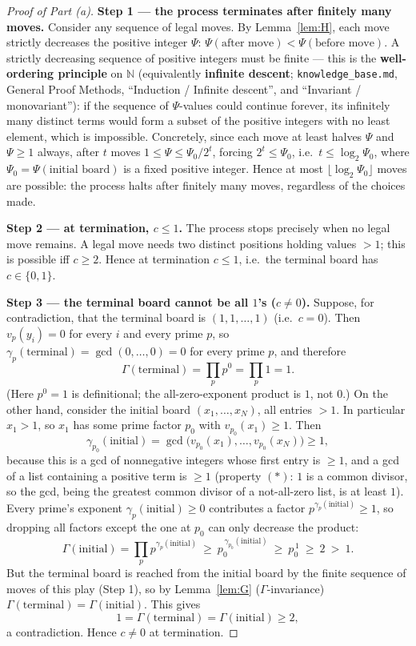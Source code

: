 \documentclass[11pt]{article}
\theoremstyle{plain}
\theoremstyle{definition}
\theoremstyle{remark}
\begin{document}
\begin{proof}[Proof of Part (a)]
\textbf{Step 1 --- the process terminates after finitely many moves.}
Consider any sequence of legal moves. By Lemma~\ref{lem:H}, each move
strictly decreases the positive integer $\Psi$:
$\Psi(\text{after move})<\Psi(\text{before move})$. A strictly decreasing
sequence of positive integers must be finite --- this is the \textbf{well-ordering
principle} on $\mathbb{N}$ (equivalently \textbf{infinite descent};
\texttt{knowledge\_base.md}, General Proof Methods, ``Induction / Infinite
descent'', and ``Invariant / monovariant''): if the sequence of $\Psi$-values
could continue forever, its infinitely many distinct terms would form a
subset of the positive integers with no least element, which is impossible.
Concretely, since each move at least halves $\Psi$ and $\Psi\ge 1$ always,
after $t$ moves $1\le\Psi\le \Psi_0/2^{t}$, forcing $2^{t}\le\Psi_0$, i.e.\
$t\le\log_2\Psi_0$, where $\Psi_0=\Psi(\text{initial board})$ is a fixed
positive integer. Hence at most $\lfloor\log_2\Psi_0\rfloor$ moves are
possible: the process halts after finitely many moves, regardless of the
choices made.

\medskip
\textbf{Step 2 --- at termination, $c\le 1$.} The process stops precisely
when no legal move remains. A legal move needs two distinct positions holding
values $>1$; this is possible iff $c\ge 2$. Hence at termination $c\le 1$,
i.e.\ the terminal board has $c\in\{0,1\}$.

\medskip
\textbf{Step 3 --- the terminal board cannot be all $1$'s ($c\ne 0$).}
Suppose, for contradiction, that the terminal board is $(1,1,\dots,1)$ (i.e.\
$c=0$). Then $v_p(y_i)=0$ for every $i$ and every prime $p$, so
$\gamma_p(\text{terminal})= \gcd(0,\dots,0)=0$ for every prime $p$, and
therefore
\[
\Gamma(\text{terminal})=\prod_p p^{0}=\prod_p 1=1.
\]
(Here $p^0=1$ is definitional; the all-zero-exponent product is $1$, not $0$.)
On the other hand, consider the initial board $(x_1,\dots,x_N)$, all entries
$>1$. In particular $x_1>1$, so $x_1$ has some prime factor $p_0$ with
$v_{p_0}(x_1)\ge 1$. Then
\[
\gamma_{p_0}(\text{initial})=\gcd\bigl(v_{p_0}(x_1),\dots,v_{p_0}(x_N)\bigr)\ge 1,
\]
because this is a gcd of nonnegative integers whose first entry is $\ge 1$,
and a gcd of a list containing a positive term is $\ge 1$ (property
$(\ast)$: $1$ is a common divisor, so the gcd, being the greatest common
divisor of a not-all-zero list, is at least $1$). Every prime's exponent
$\gamma_p(\text{initial})\ge 0$ contributes a factor
$p^{\gamma_p(\text{initial})}\ge 1$, so dropping all factors except the one at
$p_0$ can only decrease the product:
\[
\Gamma(\text{initial})=\prod_p p^{\gamma_p(\text{initial})}
\ \ge\ p_0^{\,\gamma_{p_0}(\text{initial})}\ \ge\ p_0^{\,1}\ \ge\ 2\ >\ 1.
\]
But the terminal board is reached from the initial board by the finite
sequence of moves of this play (Step 1), so by Lemma~\ref{lem:G}
($\Gamma$-invariance) $\Gamma(\text{terminal})=\Gamma(\text{initial})$. This
gives
\[
1=\Gamma(\text{terminal})=\Gamma(\text{initial})\ge 2,
\]
a contradiction. Hence $c\ne 0$ at termination.


\end{proof}
\end{document}
